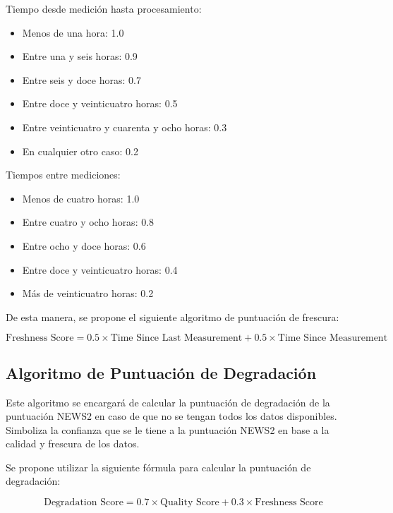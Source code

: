 Tiempo desde medición hasta procesamiento:
\begin{itemize}
    \item Menos de una hora: 1.0
    \item Entre una y seis horas: 0.9
    \item Entre seis y doce horas: 0.7
    \item Entre doce y veinticuatro horas: 0.5
    \item Entre veinticuatro y cuarenta y ocho horas: 0.3
    \item En cualquier otro caso: 0.2
\end{itemize}

Tiempos entre mediciones:
\begin{itemize}
    \item Menos de cuatro horas: 1.0
    \item Entre cuatro y ocho horas: 0.8
    \item Entre ocho y doce horas: 0.6
    \item Entre doce y veinticuatro horas: 0.4
    \item Más de veinticuatro horas: 0.2
\end{itemize}

De esta manera, se propone el siguiente algoritmo de puntuación de frescura:

\begin{equation}
    \text{Freshness Score} = 0.5 \times \text{Time Since Last Measurement} + 0.5 \times \text{Time Since Measurement}
\end{equation}

\newpage

\subsection{Algoritmo de Puntuación de Degradación}

Este algoritmo se encargará de calcular la puntuación de degradación de la puntuación NEWS2 en caso de que no se tengan todos los datos disponibles.
Simboliza la confianza que se le tiene a la puntuación NEWS2 en base a la calidad y frescura de los datos.

Se propone utilizar la siguiente fórmula para calcular la puntuación de degradación:

\begin{equation}
    \text{Degradation Score} = 0.7 \times \text{Quality Score} + 0.3 \times \text{Freshness Score}
\end{equation}

